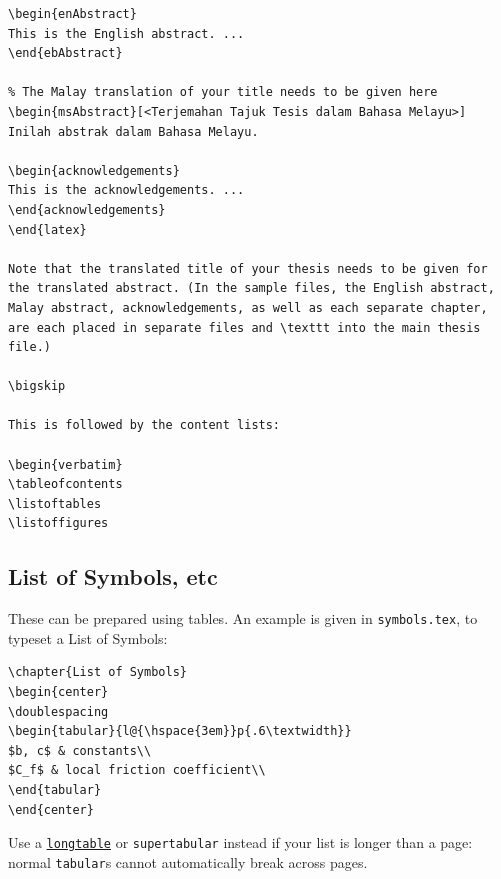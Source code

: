 \documentclass[a4paper,12pt]{scrartcl}
\begin{document}
\begin{verbatim}
\begin{enAbstract}
This is the English abstract. ...
\end{ebAbstract}

% The Malay translation of your title needs to be given here
\begin{msAbstract}[<Terjemahan Tajuk Tesis dalam Bahasa Melayu>]
Inilah abstrak dalam Bahasa Melayu.

\begin{acknowledgements}
This is the acknowledgements. ...
\end{acknowledgements}
\end{latex}

Note that the translated title of your thesis needs to be given for the translated abstract. (In the sample files, the English abstract, Malay abstract, acknowledgements, as well as each separate chapter, are each placed in separate files and \texttt into the main thesis file.)

\bigskip

This is followed by the content lists:

\begin{verbatim}
\tableofcontents
\listoftables
\listoffigures
\end{verbatim}

\subsection{List of Symbols, etc}
These can be prepared using tables. An example is given in \texttt{symbols.tex}, to typeset a List of Symbols:

\begin{verbatim}
\chapter{List of Symbols}
\begin{center}
\doublespacing
\begin{tabular}{l@{\hspace{3em}}p{.6\textwidth}}
$b, c$ & constants\\
$C_f$ & local friction coefficient\\
\end{tabular}
\end{center}
\end{verbatim}

Use a \href{https://texblog.org/2011/05/15/multi-page-tables-using-longtable/}{\texttt{longtable}} or \texttt{supertabular} instead if your list is longer than a page: normal \texttt{tabular}s cannot automatically break across pages.
\end{document}
